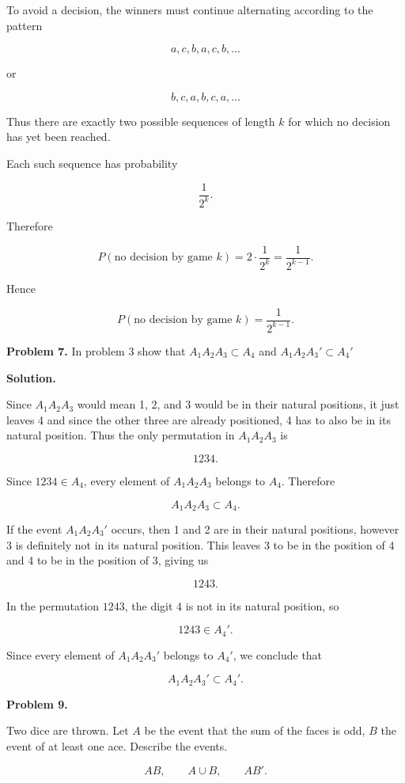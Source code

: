 \documentclass[12pt]{article}
\begin{document}
To avoid a decision, the winners must continue alternating according to the pattern

\[
a,c,b,a,c,b,\ldots
\]

or

\[
b,c,a,b,c,a,\ldots
\]

Thus there are exactly two possible sequences of length \(k\) for which no decision has yet been reached.

Each such sequence has probability

\[
\frac{1}{2^k}.
\]

Therefore

\[
P(\text{no decision by game }k)
=
2\cdot\frac{1}{2^k}
=
\frac{1}{2^{k-1}}.
\]

Hence

\[
\boxed{
P(\text{no decision by game }k)
=
\frac{1}{2^{k-1}}
}.
\]

\textbf{Problem 7.}
In problem 3 show that $A_1A_2A_3 \subset A_4$ and $A_1A_2A_3' \subset A_4'$

\textbf{Solution.}

Since $A_1A_2A_3$ would mean 1, 2, and 3 would be in their natural positions, it just leaves 4 and since the other three are already positioned, 4 has to also be in its natural position. Thus the only permutation in $A_1A_2A_3$ is

\[
1234.
\]

Since $1234 \in A_4$, every element of $A_1A_2A_3$ belongs to $A_4$. Therefore

\[
A_1A_2A_3 \subset A_4.
\]

If the event $A_1A_2A_3'$ occurs, then 1 and 2 are in their natural positions, however 3 is definitely not in its natural position. This leaves 3 to be in the position of 4 and 4 to be in the position of 3, giving us

\[
1243.
\]

In the permutation $1243$, the digit 4 is not in its natural position, so

\[
1243 \in A_4'.
\]

Since every element of $A_1A_2A_3'$ belongs to $A_4'$, we conclude that

\[
A_1A_2A_3' \subset A_4'.
\]

\textbf{Problem 9.}

Two dice are thrown. Let $A$ be the event that the sum of the faces is odd,
$B$ the event of at least one ace. Describe the events.

\[
AB, \qquad A \cup B, \qquad AB'.
\]
\end{document}
